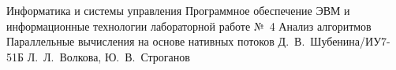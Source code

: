 \makereporttitle
    {Информатика и системы управления} %
    {Программное обеспечение ЭВМ и информационные технологии} %
    {лабораторной работе №~4} %
    {Анализ алгоритмов} %
    {Параллельные вычисления на основе нативных потоков} %
    {} %
    {Д.~В.~Шубенина/ИУ7-51Б} %
	{Л.~Л.~Волкова, Ю.~В.~Строганов} %